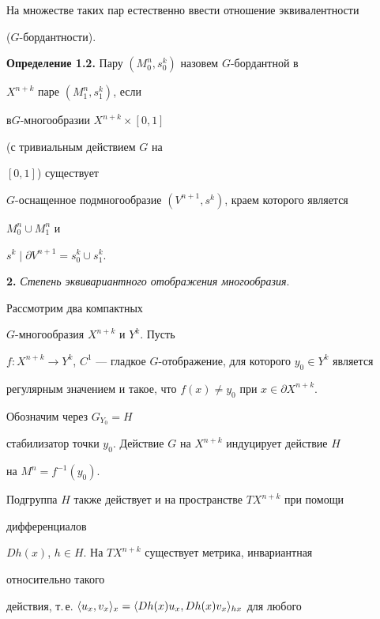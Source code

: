 \medskip 


 


На множестве таких пар естественно ввести отношение эквивалентности 


($G$-бордантности). 


\medskip 


 


{\bf Определение 1.2.} Пару $(M^n_0,s^k_0)$ назовем $G$-бордантной в 


$X^{n+k}$ паре $(M^n_1,s^k_1)$, если 


в\linebreak $G$-многообразии $X^{n+k}\times[0,1]$


(с тривиальным действием $G$ на 


$[0,1]$) существует 


$G$-оснащенное подмногообразие $(V^{n+1},s^k)$, краем которого является 


$M^n_0\cup M^n_1$ и 


$s^k\mid \partial V^{n+1}=s^k_0\cup s^k_1$. 


\medskip 


 


{\bf 2.} {\it Степень эквивариантного отображения многообразия}. 


Рассмотрим два компактных\linebreak


$G$-многообразия $X^{n+k}$ и $Y^k$. Пусть 


$f:X^{n+k}\to Y^k$, $C^1$ --- гладкое $G$-отображение, для которого $y_0\in 


Y^k$ является 


регулярным значением и такое, что $f(x)\ne y_0$ при $x\in\partial X^{n+k}$. 


Обозначим через $G_{Y_0}=H$ 


стабилизатор точки $y_0$. Действие $G$ на $X^{n+k}$ индуцирует действие $H$ 


на $M^n=f^{-1}(y_0)$. 


Подгруппа $H$ также действует и на пространстве $TX^{n+k}$ при помощи 


дифференциалов 


$Dh(x)$, $h\in H$. На $TX^{n+k}$ существует метрика, инвариантная 


относительно такого 


действия, т.\,е. $\langle u_x,v_x\rangle_x=\langle Dh(x)u_x,Dh(x)v_x\rangle_{hx}$ для любого 


